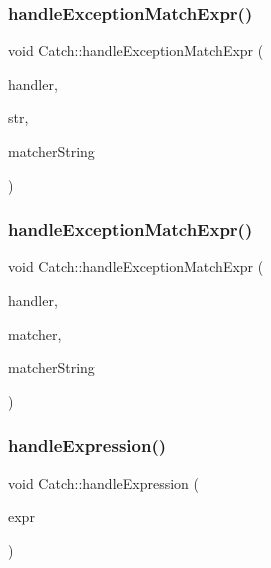 \subsubsection{\texorpdfstring{handle\+Exception\+Match\+Expr()}{handleExceptionMatchExpr()}\hspace{0.1cm}{\footnotesize\ttfamily [1/2]}}
{\footnotesize\ttfamily void Catch\+::handle\+Exception\+Match\+Expr (\begin{DoxyParamCaption}\item[{\mbox{\hyperlink{class_catch_1_1_assertion_handler}{Assertion\+Handler}} \&}]{handler,  }\item[{std\+::string const \&}]{str,  }\item[{\mbox{\hyperlink{class_catch_1_1_string_ref}{String\+Ref}}}]{matcher\+String }\end{DoxyParamCaption})}

\mbox{\label{namespace_catch_a59e375ed0dbd3d6e2f5a29c86c4d8042}} 
\subsubsection{\texorpdfstring{handle\+Exception\+Match\+Expr()}{handleExceptionMatchExpr()}\hspace{0.1cm}{\footnotesize\ttfamily [2/2]}}
{\footnotesize\ttfamily void Catch\+::handle\+Exception\+Match\+Expr (\begin{DoxyParamCaption}\item[{\mbox{\hyperlink{class_catch_1_1_assertion_handler}{Assertion\+Handler}} \&}]{handler,  }\item[{\mbox{\hyperlink{namespace_catch_aba438977e831821a2eeca82b9b4f4af2}{String\+Matcher}} const \&}]{matcher,  }\item[{\mbox{\hyperlink{class_catch_1_1_string_ref}{String\+Ref}}}]{matcher\+String }\end{DoxyParamCaption})}

\mbox{\label{namespace_catch_a65af25091f2ab61056e166765963e525}} 
\subsubsection{\texorpdfstring{handle\+Expression()}{handleExpression()}\hspace{0.1cm}{\footnotesize\ttfamily [1/2]}}
{\footnotesize\ttfamily void Catch\+::handle\+Expression (\begin{DoxyParamCaption}\item[{\mbox{\hyperlink{struct_catch_1_1_i_transient_expression}{I\+Transient\+Expression}} const \&}]{expr }\end{DoxyParamCaption})}

